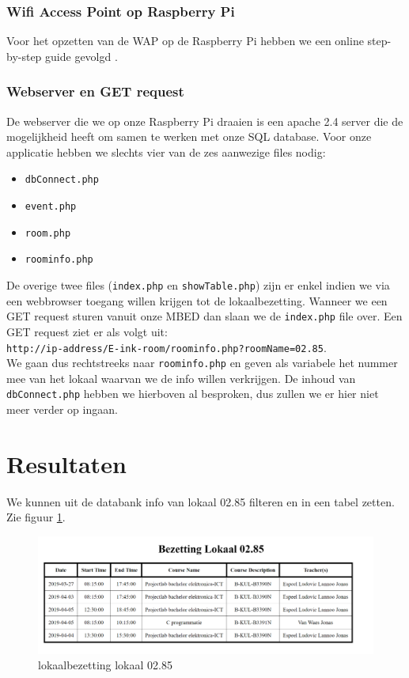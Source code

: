 \documentclass[a4paper,kul]{kulakarticle} %
\begin{document}
\subsubsection{Wifi Access Point op Raspberry Pi}
Voor het opzetten van de WAP op de Raspberry Pi hebben we een online step-by-step guide gevolgd \cite{RaspberryPiWAP}.
\subsubsection{Webserver en GET request}
De webserver die we op onze Raspberry Pi draaien is een apache 2.4 server die de mogelijkheid heeft om samen te werken met onze SQL database. Voor onze applicatie hebben we slechts vier van de zes aanwezige files nodig: 
\begin{itemize}
	\item \verb|dbConnect.php|
	\item \verb|event.php|
	\item \verb|room.php|
	\item \verb|roominfo.php|
\end{itemize}
De overige twee files (\verb|index.php| en \verb|showTable.php|) zijn er enkel indien we via een webbrowser toegang willen krijgen tot de lokaalbezetting. Wanneer we een GET request sturen vanuit onze MBED dan slaan we de \verb|index.php| file over. Een GET request ziet er als volgt uit: \\ \verb|http://ip-address/E-ink-room/roominfo.php?roomName=02.85|. \\ We gaan dus rechtstreeks naar \verb|roominfo.php| en geven als variabele het nummer mee van het lokaal waarvan we de info willen verkrijgen.  De inhoud van \verb|dbConnect.php| hebben we hierboven al besproken, dus zullen we er hier niet meer verder op ingaan.
\newpage

\section{Resultaten}

We kunnen uit de databank info van lokaal 02.85 filteren en in een tabel zetten. Zie figuur \ref{fig:vboutput}.

\begin{figure}[h]
	\centering
	\includegraphics[width=1\textwidth]{vbDatabank}
	\caption{lokaalbezetting lokaal 02.85}
	\label{fig:vboutput}
\end{figure}
\end{document}
